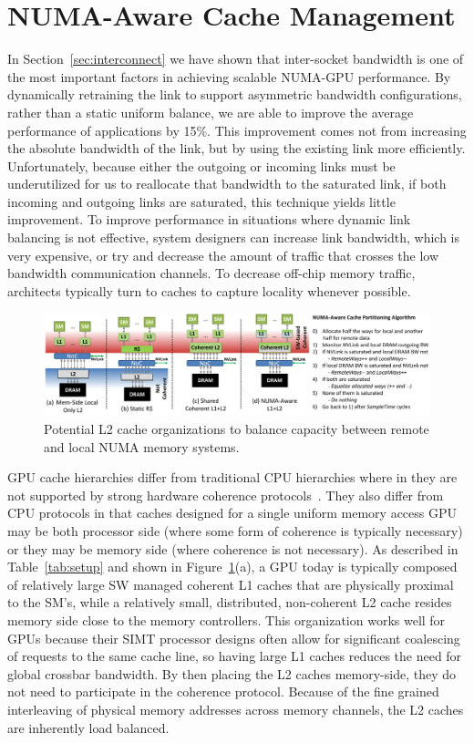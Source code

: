 \section{NUMA-Aware Cache Management}
\label{caching}
In Section~\ref{sec:interconnect} we have shown that inter-socket bandwidth is one
of the most important factors in achieving scalable NUMA-GPU performance. By
dynamically retraining the link to support asymmetric bandwidth configurations,
rather than a static uniform balance, we are able to improve the average performance
of applications by 15\%.  This improvement comes not from increasing the
absolute bandwidth of the link, but by using the existing link more efficiently.
Unfortunately, because either the outgoing or incoming links must be underutilized
for us to reallocate that bandwidth to the saturated link, if both incoming and
outgoing links are saturated, this technique yields little improvement.
To improve performance in situations where dynamic link balancing is not effective,
system designers can increase link bandwidth, which is very expensive,
or try and decrease the amount of traffic that crosses the low bandwidth
communication channels.  To decrease off-chip memory traffic, architects typically
turn to caches to capture locality whenever possible.

\begin{figure}[t]
    \centering
    \includegraphics[width=1.0\textwidth]{figures/cache_configurations_static_dynamic.pdf}
    \caption{Potential L2 cache organizations to balance capacity between remote and
    local NUMA memory systems.}
    \label{fig:cacheorg}
\end{figure}

GPU cache hierarchies differ from traditional CPU hierarchies where in they 
are not supported by strong hardware coherence protocols~\cite{Singh2013}. 
They also differ from CPU protocols in that caches designed for a single 
uniform memory access GPU may be both processor side (where some form of 
coherence is typically necessary) or they may be memory side (where coherence 
is not necessary).  As described in Table~\ref{tab:setup} and shown in 
Figure~\ref{fig:cacheorg}(a), a GPU today is typically composed of relatively 
large SW managed coherent L1 caches that are physically proximal to the SM's, 
while a relatively small, distributed, non-coherent L2 cache resides memory 
side close to the memory controllers.  This organization works well for GPUs 
because their SIMT processor designs often allow for significant coalescing 
of requests to the same cache line, so having large L1 caches reduces the 
need for global crossbar bandwidth.  By then placing the L2 caches 
memory-side, they do not need to participate in the coherence protocol.  
Because of the fine grained interleaving of physical memory addresses across 
memory channels, the L2 caches are inherently load balanced.


